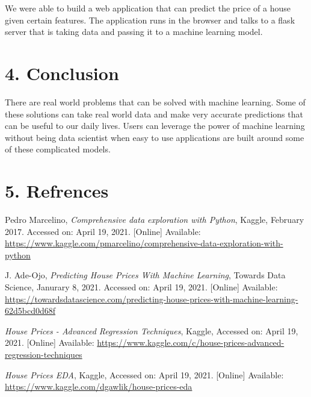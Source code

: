 We were able to build a web application that can predict the price of a
house given certain features. The application runs in the browser and
talks to a flask server that is taking data and passing it to a machine
learning model.

\section{4. Conclusion}\label{conclusion}

There are real world problems that can be solved with machine learning.
Some of these solutions can take real world data and make very accurate
predictions that can be useful to our daily lives. Users can leverage
the power of machine learning without being data scientist when easy to
use applications are built around some of these complicated models.

\section{5. Refrences}\label{refrences}

Pedro Marcelino, \emph{Comprehensive data exploration with Python},
Kaggle, February 2017. Accessed on: April 19, 2021. {[}Online{]}
Available:
\url{https://www.kaggle.com/pmarcelino/comprehensive-data-exploration-with-python}

J. Ade-Ojo, \emph{Predicting House Prices With Machine Learning},
Towards Data Science, Janurary 8, 2021. Accessed on: April 19, 2021.
{[}Online{]} Available:
\url{https://towardsdatascience.com/predicting-house-prices-with-machine-learning-62d5bcd0d68f}

\emph{House Prices - Advanced Regression Techniques}, Kaggle, Accessed
on: April 19, 2021. {[}Online{]} Available:
\url{https://www.kaggle.com/c/house-prices-advanced-regression-techniques}

\emph{House Prices EDA}, Kaggle, Accessed on: April 19, 2021.
{[}Online{]} Available:
\url{https://www.kaggle.com/dgawlik/house-prices-eda}
